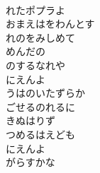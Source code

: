 \documentclass[10pt,b5j]{tarticle} %
\begin{document}
\begin{enumerate}
\begin{minipage}[c]{\blocksize}
        \vspace{\linespace}
        \item~\\
        れたポプラよ\\
        おまえはをわんとす\\
        れのをみしめて\\
        めんだの\\
        のするなれや\\
        にえんよ\\
        うはのいたずらか\\
        ごせるのれるに\\
        きぬはりず\\
        つめるはえども\\
        にえんよ\\
        がらすかな
    
    \end{minipage}
\end{enumerate} %
\end{document}
